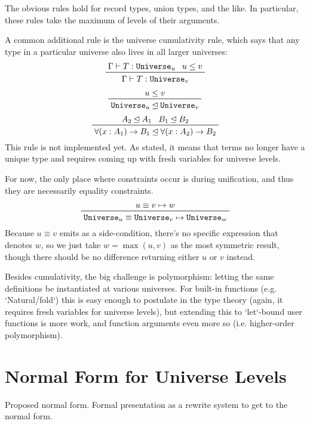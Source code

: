 \documentclass[11pt, twoside, reqno]{book}
\newcommand{\subsumedBy}{\unlhd}
\begin{document}
The obvious rules hold for record types, union types, and the like.
In particular, these rules take the maximum of levels of their arguments.

A common additional rule is the universe cumulativity rule, which says that any type in a particular universe also lives in all larger universes:
\begin{displaymath}
\prftree{\Gamma \vdash T : \texttt{Universe}_u}{u \le v}{\Gamma \vdash T : \texttt{Universe}_v}
\end{displaymath}
\begin{displaymath}
\prftree{u \le v}{\texttt{Universe}_u \subsumedBy \texttt{Universe}_v}
\end{displaymath}
\begin{displaymath}
\prftree{A_2 \subsumedBy A_1}{B_1 \subsumedBy B_2}{\forall(x : A_1) \to B_1 \subsumedBy \forall(x : A_2) \to B_2}
\end{displaymath}
This rule is not implemented yet.
As stated, it means that terms no longer have a unique type and requires coming up with fresh variables for universe levels.

For now, the only place where constraints occur is during unification, and thus they are necessarily equality constraints.
\begin{displaymath}
\prftree{u \equiv v \mapsto w}{\texttt{Universe}_u \equiv \texttt{Universe}_v \mapsto \texttt{Universe}_w}
\end{displaymath}
Because $u \equiv v$ emits as a side-condition, there's no specific expression that denotes $w$, so we just take $w = \max(u,v)$ as the most symmetric result, though there should be no difference returning either $u$ or $v$ instead.

Besides cumulativity, the big challenge is polymorphism: letting the same definitions be instantiated at various universes.
For built-in functions (e.g. \inHS`Natural/fold`) this is easy enough to postulate in the type theory (again, it requires fresh variables for universe levels), but extending this to \inHS`let`-bound user functions is more work, and function arguments even more so (i.e. higher-order polymorphism).

\section{Normal Form for Universe Levels}
\label{nf-uni-lvl}

Proposed normal form. Formal presentation as a rewrite system to get to the normal form.
\end{document}

